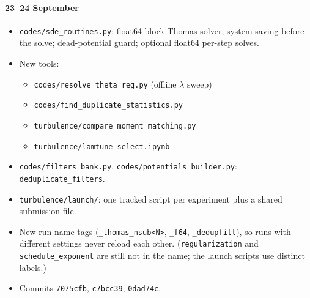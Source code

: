 \documentclass[11pt,a4paper]{article}
\newcommand{\code}[1]{\texttt{#1}}
\begin{document}
\paragraph{23--24 September}
\begin{itemize}
  \item \code{codes/sde\_routines.py}: float64 block-Thomas solver; system saving before the solve;
        dead-potential guard; optional float64 per-step solves.
  \item New tools:
        \begin{itemize}
          \item \code{codes/resolve\_theta\_reg.py} (offline $\lambda$ sweep)
          \item \code{codes/find\_duplicate\_statistics.py}
          \item \code{turbulence/compare\_moment\_matching.py}
          \item \code{turbulence/lamtune\_select.ipynb}
        \end{itemize}
  \item \code{codes/filters\_bank.py}, \code{codes/potentials\_builder.py}: \code{deduplicate\_filters}.
  \item \code{turbulence/launch/}: one tracked script per experiment plus a shared submission file.
  \item New run-name tags (\code{\_thomas\_nsub<N>}, \code{\_f64}, \code{\_dedupfilt}),
        so runs with different settings never reload each other.
        (\code{regularization} and \code{schedule\_exponent} are still not in the name;
        the launch scripts use distinct labels.)
  \item Commits \code{7075cfb}, \code{c7bcc39}, \code{0dad74c}.
\end{itemize}
\end{document}
